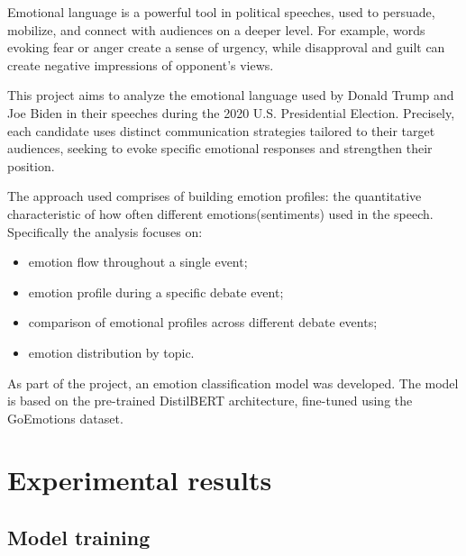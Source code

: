 \documentclass[pdflatex,sn-mathphys-num]{sn-jnl}%
\begin{document}
Emotional language is a powerful tool in political speeches, used to persuade, mobilize, and connect with audiences on a deeper level. For example, words evoking fear or anger create a sense of urgency, while disapproval and guilt can create negative impressions of opponent's views.

This project aims to analyze the emotional language used by Donald Trump and Joe Biden in their speeches during the 2020 U.S. Presidential Election. Precisely, each candidate uses distinct communication strategies tailored to their target audiences, seeking to evoke specific emotional responses and strengthen their position.

The approach used comprises of building emotion profiles: the quantitative characteristic of how often different emotions(sentiments) used in the speech.
Specifically the analysis focuses on:
\begin{itemize}

	\item emotion flow throughout a single event;
	\item emotion profile during a specific debate event;
	\item comparison of emotional profiles across different debate events;
	\item emotion distribution by topic.
\end{itemize}

As part of the project, an emotion classification model was developed. The model is based on the pre-trained DistilBERT architecture, fine-tuned using the GoEmotions dataset. 

\section{Experimental results}\label{sec3}
\subsection{Model training}
\end{document}
